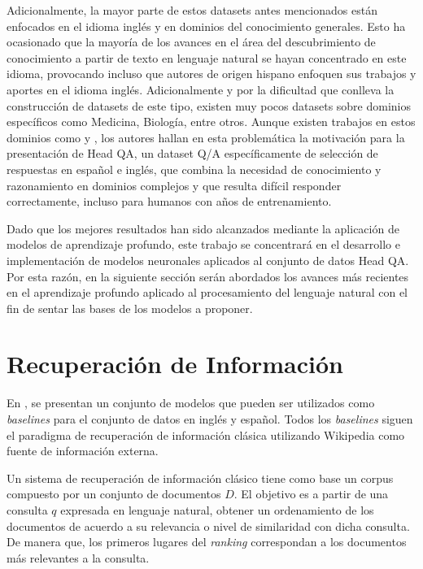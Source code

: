 Adicionalmente, la mayor parte de estos datasets antes mencionados están enfocados en el idioma inglés y en dominios del conocimiento generales. Esto ha ocasionado que la mayoría de los avances en el área del descubrimiento de conocimiento a partir de texto en lenguaje natural se hayan concentrado en este idioma, provocando incluso que autores de origen hispano enfoquen sus trabajos y aportes en el idioma inglés. Adicionalmente y por la dificultad que conlleva la construcción de datasets de este tipo, existen muy pocos datasets sobre dominios específicos como Medicina, Biología, entre otros. Aunque existen trabajos en estos dominios como \cite{2015-semantic-medical-texts} y \cite{2018-nentidis-results}, los autores \cite{2019-head-qa} hallan en esta problemática la motivación para la presentación de Head QA, un dataset Q/A específicamente de selección de respuestas en español e inglés, que combina la necesidad de conocimiento y razonamiento en dominios complejos y que resulta difícil responder correctamente, incluso para humanos con años de entrenamiento.

Dado que los mejores resultados han sido alcanzados mediante la aplicación de modelos de aprendizaje profundo, este trabajo se concentrará en el desarrollo e implementación de modelos neuronales aplicados al conjunto de datos Head QA. Por esta razón, en la siguiente sección serán abordados los avances más recientes en el aprendizaje profundo aplicado al procesamiento del lenguaje natural con el fin de sentar las bases de los modelos a proponer.

\section{Recuperación de Información}

En \cite{2019-head-qa}, se presentan un conjunto de modelos que pueden ser utilizados como \textit{baselines} para el conjunto de datos en inglés y español. Todos los \textit{baselines} siguen el paradigma de recuperación de información clásica utilizando Wikipedia como fuente de información externa. 

Un sistema de recuperación de información clásico tiene como base un corpus compuesto por un conjunto de documentos $D$. El objetivo es a partir de una consulta $q$ expresada en lenguaje natural, obtener un ordenamiento de los documentos de acuerdo a su relevancia o nivel de similaridad con dicha consulta. De manera que, los primeros lugares del \textit{ranking} correspondan a los documentos más relevantes a la consulta.

